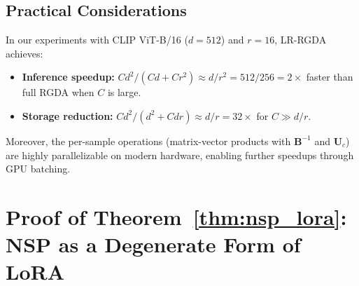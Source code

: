 \documentclass{article}
\begin{document}
\subsection{Practical Considerations}

In our experiments with CLIP ViT-B/16 ($d = 512$) and $r = 16$, LR-RGDA achieves:
\begin{itemize}
    \item \textbf{Inference speedup:} $Cd^2 / (Cd + Cr^2) \approx d/r^2 = 512/256 = 2\times$ faster than full RGDA when $C$ is large.
    \item \textbf{Storage reduction:} $Cd^2 / (d^2 + Cdr) \approx d/r = 32\times$ for $C \gg d/r$.
\end{itemize}
Moreover, the per-sample operations (matrix-vector products with $\mathbf{B}^{-1}$ and $\mathbf{U}_c$) are highly parallelizable on modern hardware, enabling further speedups through GPU batching.


\iffalse
\section{Proof of Theorem~\ref{thm:nsp_lora}: NSP as a Degenerate Form of LoRA}
\label{app:thm1}
\end{document}
